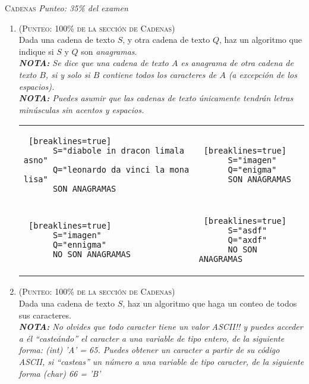\documentclass{article}
\begin{document}
\textsc{Cadenas} \textit{Punteo: 35\% del examen}
\begin{enumerate}
\item \textsc{(Punteo: 100\% de la sección de Cadenas)}\\ Dada una cadena de texto $S$, y otra cadena de texto $Q$, haz un algoritmo que indique si $S$ y $Q$ son \textit{anagramas}. \\
  \textit{\textbf{NOTA:} Se dice que una cadena de texto $A$ es anagrama de otra cadena de texto $B$, si y solo si $B$ contiene todos los caracteres de $A$ (a excepción de los espacios).}\\
  \textit{\textbf{NOTA:} Puedes asumir que las cadenas de texto únicamente tendrán letras minúsculas sin acentos y espacios.}

  \begin{tabular} {p{8.5cm} p{8.5cm}}
    \begin{lstlisting} [breaklines=true]
      S="diabole in dracon limala asno"
      Q="leonardo da vinci la mona lisa"
      SON ANAGRAMAS
    \end{lstlisting} &    
    \begin{lstlisting} [breaklines=true]
      S="imagen"
      Q="enigma"
      SON ANAGRAMAS
    \end{lstlisting} \\
    \begin{lstlisting} [breaklines=true]
      S="imagen"
      Q="ennigma"
      NO SON ANAGRAMAS
    \end{lstlisting} &    
    \begin{lstlisting} [breaklines=true]
      S="asdf"
      Q="axdf"
      NO SON ANAGRAMAS
    \end{lstlisting}    
  \end{tabular}
  
\item \textsc{(Punteo: 100\% de la sección de Cadenas)}\\
  Dada una cadena de texto $S$, haz un algoritmo que haga un conteo de todos sus caracteres.\\
  \textit{\textbf{NOTA:} No olvides que todo caracter tiene un valor ASCII!! y puedes acceder a él ``casteándo'' el caracter a una variable de tipo entero, de la siguiente forma: (int) 'A' = 65. Puedes obtener un caracter a partir de su código ASCII, si ``casteas'' un número a una variable de tipo caracter, de la siguiente forma (char) 66 = 'B'}

  \begin{tabular} {p{8.5cm} p{8.5cm}}
    

\end{tabular}
\end{enumerate}
\end{document}
